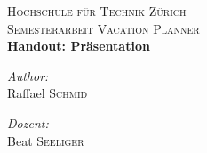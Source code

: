 \begin{titlepage}
 
\begin{center}
 
  
\textsc{\LARGE Hochschule f\"ur Technik Z\"urich}\\[1.5cm]
 
\textsc{\Large Semesterarbeit Vacation Planner}\\[1.5cm]
 { \huge \bfseries Handout: Pr\"asentation}\\[5cm]
 \begin{minipage}{0.4\textwidth}
\begin{flushleft} \large
\emph{Author:}\\
Raffael \textsc{Schmid}
\end{flushleft}
\end{minipage}
\begin{minipage}{0.4\textwidth}
\begin{flushright} \large
\emph{Dozent:} \\
Beat \textsc{Seeliger}
\end{flushright}
\end{minipage}
\vfill
\end{center}
\end{titlepage}
